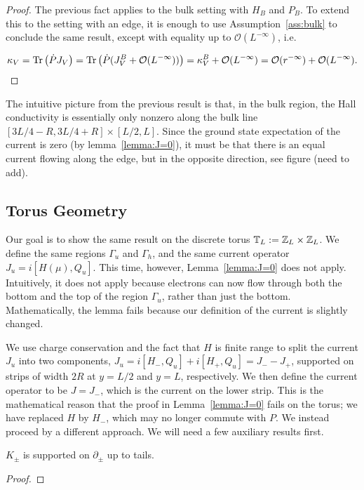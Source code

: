 \documentclass[12pt, letterpaper]{article}
\begin{document}
\begin{proof}
The previous fact applies to the bulk setting with $H_B$ and $P_B$. To extend this to the setting with an edge, it is enough to use Assumption~\ref{ass:bulk} to conclude the same result, except with equality up to $\mathcal{O}(L^{-\infty})$, i.e.

\[\kappa_V = \text{Tr}\left(\dot{P}J_V\right) = \text{Tr}\left(\dot{P}(J_V^B + \mathcal{O}(L^{-\infty}))\right) = \kappa_V^B + \mathcal{O}(L^{-\infty}) = \mathcal{O}(r^{-\infty}) + \mathcal{O}(L^{-\infty}).\]

\end{proof}


The intuitive picture from the previous result is that, in the bulk region, the Hall conductivity is essentially only nonzero along  the bulk line $[3L/4-R, 3L/4+R] \times [L/2, L]$. Since the ground state expectation of the current is zero (by lemma~\ref{lemma:J=0}), it must be that there is an equal current flowing along the edge, but in the opposite direction, see figure (need to add).

\subsection{Torus Geometry}

Our goal is to show the same result on the discrete torus $\mathbb{T}_L := \mathbb{Z}_L \times \mathbb{Z}_L$. We define the same regions $\Gamma_u$ and $\Gamma_h$, and the same current operator $J_u = i[H(\mu), Q_u]$. This time, however, Lemma~\ref{lemma:J=0} does not apply. Intuitively, it does not apply because electrons can now flow through both the bottom and the top of the region $\Gamma_u$, rather than just the bottom. Mathematically, the lemma fails because our definition of the current is slightly changed.

We use charge conservation and the fact that $H$ is finite range to split the current $J_u$ into two components, $J_u = i[H_-, Q_u] + i[H_+, Q_u] = J_- - J_+$, supported on strips of width $2R$ at $y=L/2$ and $y=L$, respectively. We then define the current operator to be $J=J_-$, which is the current on the lower strip. This is the mathematical reason that the proof in Lemma~\ref{lemma:J=0} fails on the torus; we have replaced $H$ by $H_-$, which may no longer commute with $P$. We instead proceed by a different approach. We will need a few auxiliary results first.

\begin{lemma}
$K_\pm$ is supported on $\partial_\pm$ up to tails.
\label{SupportOfK}
\end{lemma}
\begin{proof}

\end{proof}
\end{document}
